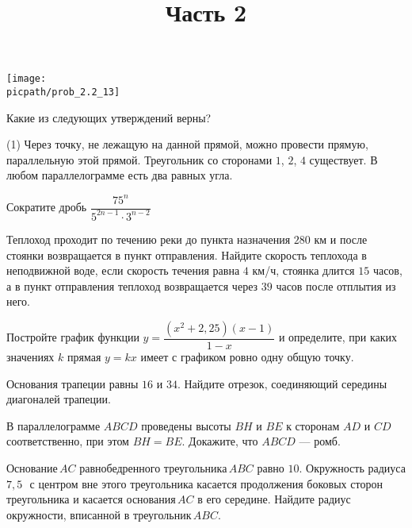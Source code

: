 \begin{training}[1]
\begin{listofex}[resume]
		\gapwidth
		\begin{minipage}[t]{\picwidth}
			\texttt{[image: \\picpath/prob\_2.2\_13]}
		\end{minipage}
		\item Какие из следующих утверждений верны?
		\begin{tasks}(1)
			\task Через точку, не лежащую на данной прямой, можно провести прямую, параллельную этой
			 прямой.
			 \task Треугольник со сторонами \( 1 \), \( 2 \), \( 4 \) существует.
			 \task В любом параллелограмме есть два равных угла.
		\end{tasks}
		\foranswer
		\title{Часть 2}
		\item Сократите дробь \( \dfrac{75^n}{5^{2n-1}\cdot3^{n-2}} \)
		\item Теплоход проходит по течению реки до пункта назначения \( 280 \) км и после стоянки возвращается в пункт отправления. Найдите скорость теплохода в неподвижной воде, если скорость течения равна \( 4 \) км/ч, стоянка длится \( 15 \) часов, а в пункт отправления теплоход возвращается через \( 39 \) часов после отплытия из него.
		\item Постройте график функции \( y=\dfrac{(x^2+2,25)(x-1)}{1-x} \) и определите, при каких значениях \( k \) прямая \( y=kx \) имеет с графиком ровно одну общую точку.
		\item Основания трапеции равны \( 16 \) и \( 34 \). Найдите отрезок, соединяющий середины диагоналей трапеции.
		\item В параллелограмме \( ABCD \) проведены высоты \( BH \) и \( BE \) к сторонам \( AD \) и \( CD \) соответственно, при этом \( BH=BE \). Докажите, что \( ABCD \) --- ромб.
		\item Основание \( AC \) равнобедренного треугольника \( ABC \) равно \( 10 \). Окружность радиуса \( 7,5 \) \( \, \) с центром вне этого треугольника касается продолжения боковых сторон треугольника и касается основания \( AC \) в его середине. Найдите радиус окружности, вписанной в треугольник \( ABC \).
	\end{listofex}
\end{training}

